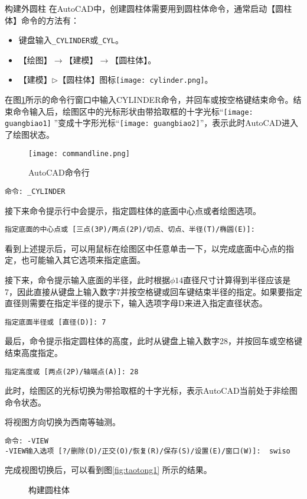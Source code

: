 \begin{procedure}
\item 构建外圆柱
在AutoCAD中，创建圆柱体需要用到圆柱体命令，通常启动【圆柱体】命令的方法有：
\begin{itemize}
\item 键盘输入\lstinline$_CYLINDER$或\lstinline$_CYL$。
\item 【绘图】$\rightarrow$【建模】$\rightarrow$【圆柱体】。
\item 【建模】$\triangleright$【圆柱体】图标\texttt{[image: cylinder.png]}。
\end{itemize}
在图\ref{fig:commandline}所示的命令行窗口中输入CYLINDER命令，并回车或按空格键结束命令。结束命令输入后，绘图区中的光标形状由带拾取框的十字光标“\texttt{[image: guangbiao1]} ”变成十字形光标“\texttt{[image: guangbiao2]}”，表示此时AutoCAD进入了绘图状态。
\begin{figure}[htbp]
\centering
\texttt{[image: commandline.png]}
\caption{AutoCAD命令行}\label{fig:commandline}
\end{figure}
\begin{lstlisting}
命令: _CYLINDER
\end{lstlisting}
接下来命令提示行中会提示，指定圆柱体的底面中心点或者绘图选项。
\begin{lstlisting}
指定底面的中心点或 [三点(3P)/两点(2P)/切点、切点、半径(T)/椭圆(E)]:
\end{lstlisting}
看到上述提示后，可以用鼠标在绘图区中任意单击一下，以完成底面中心点的指定，也可能输入其它选项来指定底面。

接下来，命令提示输入底面的半径，此时根据$\phi 14$直径尺寸计算得到半径应该是7，因此直接从键盘上输入数字7并按空格键或回车键结束半径的指定。如果要指定直径则需要在指定半径的提示下，输入选项字母D来进入指定直径状态。
\begin{lstlisting}
指定底面半径或 [直径(D)]: 7
\end{lstlisting}
最后，命令提示指定圆柱体的高度，此时从键盘上输入数字28，并按回车或空格键结束高度指定。
\begin{lstlisting}
指定高度或 [两点(2P)/轴端点(A)]: 28
\end{lstlisting}
此时，绘图区的光标切换为带拾取框的十字光标，表示AutoCAD当前处于非绘图命令状态。
\item 将视图方向切换为西南等轴测。
\begin{lstlisting}
命令: -VIEW
-VIEW输入选项 [?/删除(D)/正交(O)/恢复(R)/保存(S)/设置(E)/窗口(W)]:  swiso
\end{lstlisting}
完成视图切换后，可以看到图\ref{fig:taotong1} 所示的结果。
\begin{figure}[htbp]
\centering
{}\hspace{20pt}
\hspace{20pt}
\caption{构建圆柱体}
\end{figure}


\end{procedure}
